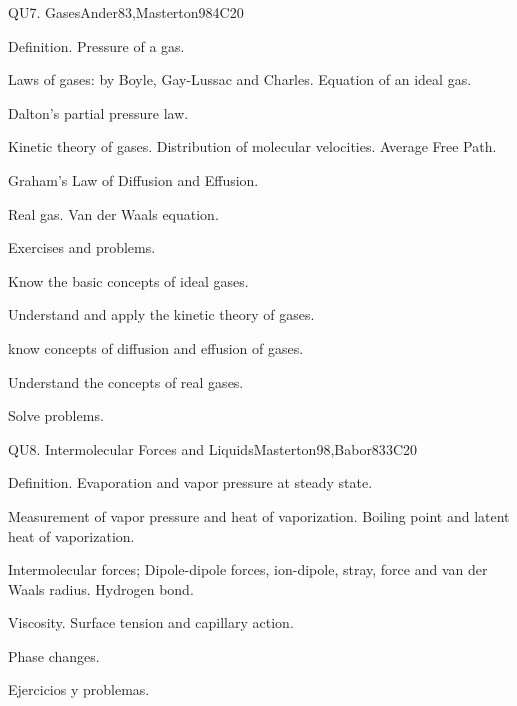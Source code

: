 \begin{syllabus}
\begin{unit}{QU7. Gases}{}{Ander83,Masterton98}{4}{C20}
\begin{topics}
      \item Definition. Pressure of a gas.
      \item Laws of gases: by Boyle, Gay-Lussac and Charles. Equation of an ideal gas.
      \item Dalton's partial pressure law.
      \item Kinetic theory of gases. Distribution of molecular velocities. Average Free Path.
      \item Graham's Law of Diffusion and Effusion.
      \item Real gas. Van der Waals equation.
      \item Exercises and problems.
   \end{topics}

   \begin{learningoutcomes}

      \item Know the basic concepts of ideal gases.
      \item Understand and apply the kinetic theory of gases.
      \item know concepts of diffusion and effusion of gases.
      \item Understand the concepts of real gases.
      \item Solve problems.

   \end{learningoutcomes}
\end{unit}

\begin{unit}{QU8. Intermolecular Forces and Liquids}{}{Masterton98,Babor83}{3}{C20}
\begin{topics}

      \item Definition. Evaporation and vapor pressure at steady state.
      \item Measurement of vapor pressure and heat of vaporization. Boiling point and latent heat of vaporization.
      \item Intermolecular forces; Dipole-dipole forces, ion-dipole, stray, force and van der Waals radius. Hydrogen bond.
      \item Viscosity. Surface tension and capillary action.
      \item Phase changes.
      \item Ejercicios y problemas.
    \end{topics}


\end{unit}
\end{syllabus}
